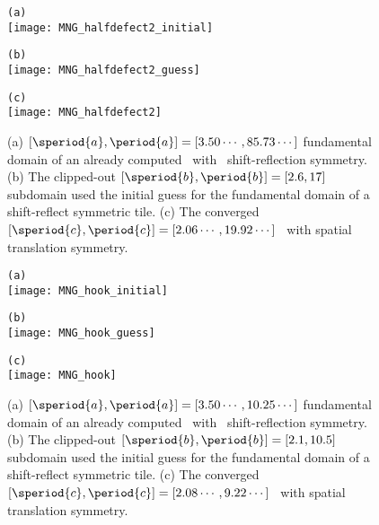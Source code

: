 \begin{figure}
\begin{minipage}[height=.4\textheight]{.5\textwidth}
\centering \small{\texttt{(a)}}\\
\texttt{[image: MNG\_halfdefect2\_initial]}
\end{minipage}
\begin{minipage}[height=.4\textheight]{.5\textwidth}
\centering \small{\texttt{(b)}}\\
\texttt{[image: MNG\_halfdefect2\_guess]}
\end{minipage}
\begin{minipage}[height=.1\textheight]{\textwidth}
\centering \small{\texttt{(c)}}\\
\texttt{[image: MNG\_halfdefect2]}
\end{minipage}
\caption{ \label{fig:halfdefect2}
(a)
$[\speriod{a},\period{a}]=[3.50\cdots,85.73\cdots]$ fundamental domain
of an already computed \twot\ with \spt\ shift-reflection symmetry.
(b)
The clipped-out $[\speriod{b},\period{b}]=[2.6,17]$ subdomain used the
initial guess for the fundamental domain of a shift-reflect symmetric tile.
(c)
The converged $[\speriod{c},\period{c}]=[2.06\cdots,19.92\cdots]$ \twot\
with spatial translation symmetry.
}
\end{figure}

\begin{figure}
\begin{minipage}[height=.1\textheight]{.5\textwidth}
\centering \small{\texttt{(a)}}\\
\texttt{[image: MNG\_hook\_initial]}
\end{minipage}
\begin{minipage}[height=.1\textheight]{.5\textwidth}
\centering \small{\texttt{(b)}}\\
\texttt{[image: MNG\_hook\_guess]}
\end{minipage}
\begin{minipage}[height=.1\textheight]{\textwidth}
\centering \small{\texttt{(c)}}\\
\texttt{[image: MNG\_hook]}
\end{minipage}
\caption{ \label{fig:hook}
(a)
$[\speriod{a},\period{a}]=[3.50\cdots,10.25\cdots]$ fundamental domain
of an already computed \twot\ with \spt\ shift-reflection symmetry.
(b)
The clipped-out $[\speriod{b},\period{b}]=[2.1,10.5]$ subdomain used the
initial guess for the fundamental domain of a shift-reflect symmetric tile.
(c)
The converged $[\speriod{c},\period{c}]=[2.08\cdots,9.22\cdots]$  \twot\
with spatial translation symmetry.
}
\end{figure}

